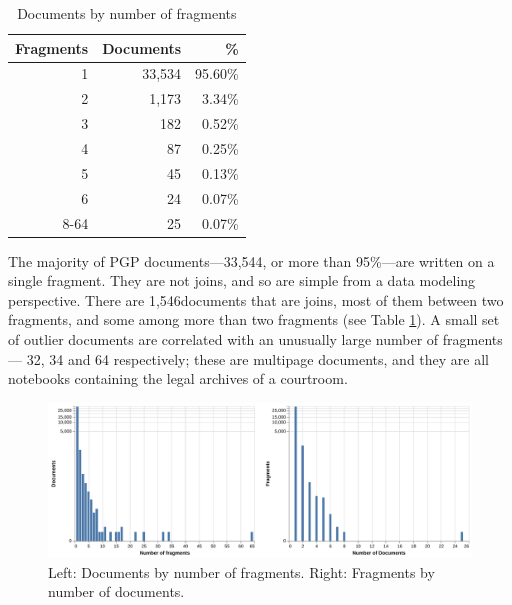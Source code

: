 \documentclass{article}
\def\singleFragmentDocuments{33,544}
\def\totalJoins{1,546}
\begin{document}
\begin{table}
\begin{center}
\caption{Documents by number of fragments}
\label{table:docs_per_numfrags}
\begin{tabular}{rrr}
\toprule
{Fragments} & {Documents} & {\%}\\
\midrule
1 & 33,534 & 95.60\% \\
2 & 1,173 & 3.34\% \\
3 & 182 & 0.52\% \\
4 & 87 & 0.25\% \\
5 & 45 & 0.13\% \\
6 & 24 & 0.07\% \\
8-64 & 25 & 0.07\% \\
\bottomrule
\end{tabular}
\end{center}
\end{table}

The majority of PGP documents—\singleFragmentDocuments, or more than 95\%—are written on a single fragment. They are not joins, and so are simple from a data modeling perspective. There are \totalJoins\space documents that are joins, most of them between two fragments, and some among more than two fragments (see Table \ref{table:docs_per_numfrags}). A small set of outlier documents are correlated with an unusually large number of fragments — 32, 34 and 64 respectively; these are multipage documents, and they are all notebooks containing the legal archives of a courtroom.


\begin{figure}[!hbt]
  \includegraphics[width=1.0\linewidth]{charts/docs_frags_2up.pdf}
  \centering
  \caption{Left: Documents by number of fragments. Right: Fragments by number of documents.}
  \label{fig:docs_per_num_frags}
\end{figure}

\end{document}
